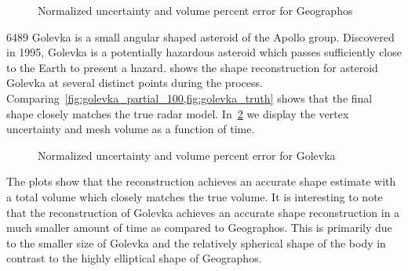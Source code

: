 \documentclass[letterpaper, paper,11pt]{AAS}		%
\begin{document}
\begin{figure}[htbp]
    \centering
    
    \caption{Normalized uncertainty and volume percent error for Geographos\label{fig:geographos_metrics}}
\end{figure}

\num{6489} Golevka is a small angular shaped asteroid of the Apollo group.
Discovered in \num{1995}, Golevka is a potentially hazardous asteroid which passes sufficiently close to the Earth to present a hazard.
 shows the shape reconstruction for asteroid Golevka at several distinct points during the process.
Comparing~\cref{fig:golevka_partial_100,fig:golevka_truth} shows that the final shape closely matches the true radar model.
In~\cref{fig:golevka_metrics} we display the vertex uncertainty and mesh volume as a function of time.

\begin{figure}[htbp]
    \centering
    
    \caption{Normalized uncertainty and volume percent error for Golevka\label{fig:golevka_metrics}}
\end{figure}

The plots show that the reconstruction achieves an accurate shape estimate with a total volume which closely matches the true volume.
It is interesting to note that the reconstruction of Golevka achieves an accurate shape reconstruction in a much smaller amount of time as compared to Geographos.
This is primarily due to the smaller size of Golevka and the relatively spherical shape of the body in contrast to the highly elliptical shape of Geographos.
\end{document}
